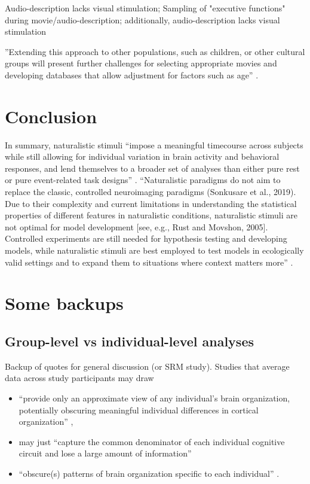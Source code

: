 %
Audio-description lacks visual stimulation; Sampling of "executive functions"
during movie/audio-description;
%
additionally, audio-description lacks visual stimulation

%
''Extending this approach to other populations, such as children, or other
cultural groups will present further challenges for selecting appropriate movies
and developing databases that allow adjustment for factors such as age''
\citep{jiahui2020predicting}.




\section{Conclusion}

%
In summary, naturalistic stimuli ``impose a meaningful timecourse across
subjects while still allowing for individual variation in brain activity and
behavioral responses, and lend themselves to a broader set of analyses than
either pure rest or pure event-related task designs'' \citep{finn2017can}.
%
``Naturalistic paradigms do not aim to replace the classic, controlled
neuroimaging paradigms (Sonkusare et al., 2019). Due to their complexity and
current limitations in understanding the statistical properties of different
features in naturalistic conditions, naturalistic stimuli are not optimal for
model development [see, e.g., Rust and Movshon, 2005]. Controlled experiments
are still needed for hypothesis testing and developing models, while
naturalistic stimuli are best employed to test models in ecologically valid
settings and to expand them to situations where context matters
more'' \citep{saarimaki2021naturalistic}.




\section{Some backups}


\subsection{Group-level vs individual-level analyses}

Backup of quotes for general discussion (or SRM study).  Studies that average
data across study participants may draw

\begin{itemize}

\item ``provide only an approximate view of any individual's brain organization,
    potentially obscuring meaningful individual differences in cortical
        organization'' \citep{laumann2015functional},

\item may just ``capture the common denominator of each individual cognitive
    circuit and lose a large amount of information''

\item ``obscure(s) patterns of brain organization specific to each individual''
    \citep{laumann2015functional}.

\end{itemize}


